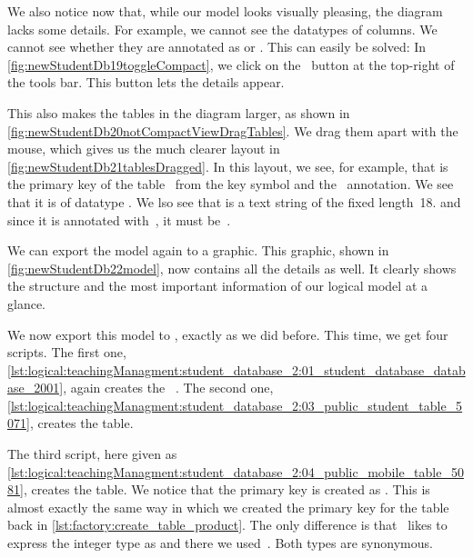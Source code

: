 We also notice now that, while our model looks visually pleasing, the diagram lacks some details.
For example, we cannot see the datatypes of columns.
We cannot see whether they are annotated as  or .
This can easily be solved:
In \cref{fig:newStudentDb19toggleCompact}, we click on the  \pgmodelerToggleCompact\ button at the top-right of the tools bar.
This button lets the details appear.

This also makes the tables in the diagram larger, as shown in \cref{fig:newStudentDb20notCompactViewDragTables}.
We drag them apart with the mouse, which gives us the much clearer layout in \cref{fig:newStudentDb21tablesDragged}.
In this layout, we see, for example, that  is the primary key of the table~ from the key symbol and the ~annotation.
We see that it is of datatype .
We lso see that  is a text string of the fixed length~18.
and since it is annotated with~, it must be~.

We can export the model again to a  graphic.
This graphic, shown in \cref{fig:newStudentDb22model}, now contains all the details as well.
It clearly shows the structure and the most important information of our logical model at a glance.

We now export this model to \sql, exactly as we did before.
This time, we get four scripts.
The first one, \cref{lst:logical:teachingManagment:student_database_2:01_student_database_database_2001}, again creates the ~\db.
The second one, \cref{lst:logical:teachingManagment:student_database_2:03_public_student_table_5071}, creates the  table.

The third script, here given as \cref{lst:logical:teachingManagment:student_database_2:04_public_mobile_table_5081}, creates the  table.
We notice that the primary key is created as .
This is almost exactly the same way in which we created the primary key for the  table back in \cref{lst:factory:create_table_product}.
The only difference is that \pgmodeler\ likes to express the integer type as  and there we used~.
Both types are synonymous.

